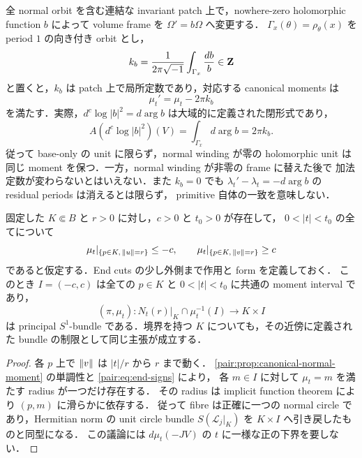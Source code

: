 \begin{remark}
\label{pair:rem:normal-frame-winding}
全 normal orbit を含む連結な invariant patch 上で，nowhere-zero holomorphic function
$b$ によって volume frame を $\Omega'=b\Omega$ へ変更する．
$\Gamma_x(\theta)=\rho_\theta(x)$ を period $1$ の向き付き orbit とし，
\[
 k_b=\frac{1}{2\pi\sqrt{-1}}\int_{\Gamma_x}\frac{db}{b}\in\mathbf Z
\]
と置くと，$k_b$ は patch 上で局所定数であり，対応する canonical moments は
\begin{equation}\label{pair:eq:normal-frame-winding}
 \mu_t'=\mu_t-2\pi k_b
\end{equation}
を満たす．実際，$d^c\log|b|^2=d\arg b$ は大域的に定義された閉形式であり，
\[
 A(d^c\log|b|^2)(V)
 =\int_{\Gamma_x}d\arg b=2\pi k_b.
\]
従って base-only の unit に限らず，normal winding が零の holomorphic unit は
同じ moment を保つ．一方，normal winding が非零の frame に替えた後で
加法定数が変わらないとはいえない．また $k_b=0$ でも
$\lambda_t'-\lambda_t=-d\arg b$ の residual periods は消えるとは限らず，
primitive 自体の一致を意味しない．
\end{remark}

\begin{proposition}
\label{pair:prop:common-moment-interval}
固定した $K\Subset B$ と $r>0$ に対し，$c>0$ と $t_0>0$ が存在して，
$0<|t|<t_0$ の全てについて
\begin{equation}\label{pair:eq:end-signs}
 \mu_t|_{\{p\in K,\,\left\lVert u\right\rVert=r\}}\le-c,
 \qquad
 \mu_t|_{\{p\in K,\,\left\lVert v\right\rVert=r\}}\ge c
\end{equation}
であると仮定する．End cuts の少し外側まで作用と form を定義しておく．
このとき $I=(-c,c)$ は全ての $p\in K$ と $0<|t|<t_0$ に共通の moment interval であり，
\[
 (\pi,\mu_t):N_t(r)|_K\cap\mu_t^{-1}(I)\longrightarrow K\times I
\]
は principal $S^1$-bundle である．境界を持つ $K$ についても，その近傍に定義された
bundle の制限として同じ主張が成立する．
\end{proposition}

\begin{proof}
各 $p$ 上で $\left\lVert v\right\rVert$ は $|t|/r$ から $r$ まで動く．
\cref{pair:prop:canonical-normal-moment} の単調性と \eqref{pair:eq:end-signs} により，
各 $m\in I$ に対して $\mu_t=m$ を満たす radius が一つだけ存在する．
その radius は implicit function theorem により $(p,m)$ に滑らかに依存する．
従って fibre は正確に一つの normal circle であり，Hermitian norm の unit circle bundle
$S(\mathcal L_j|_K)$ を $K\times I$ へ引き戻したものと同型になる．
この議論には $d\mu_t(-JV)$ の $t$ に一様な正の下界を要しない．
\end{proof}

